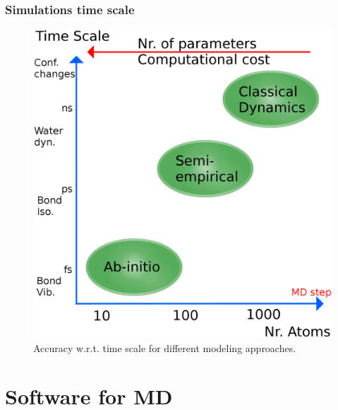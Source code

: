 \documentclass{beamer}
\begin{document}
\begin{frame}\frametitle{Simulations time scale}

\begin{figure}
\includegraphics[scale=0.081]{simul_time_scales.eps}
\caption{{\scriptsize Accuracy w.r.t. time scale for different modeling approaches.}}
\end{figure}

\end{frame}

%
% 

\section{Software for MD}
\end{document}
